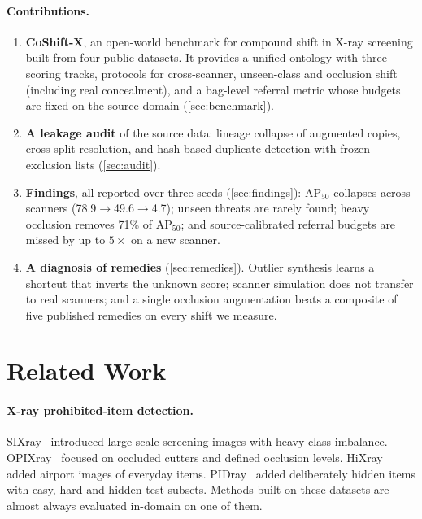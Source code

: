 \documentclass[10pt,twocolumn,letterpaper]{article}
\begin{document}
\paragraph{Contributions.}
\begin{enumerate}
\item \textbf{CoShift-X}, an open-world benchmark for compound shift in X-ray screening built from four public datasets. It provides a unified ontology with three scoring tracks, protocols for cross-scanner, unseen-class and occlusion shift (including real concealment), and a bag-level referral metric whose budgets are fixed on the source domain (\cref{sec:benchmark}).
\item \textbf{A leakage audit} of the source data: lineage collapse of augmented copies, cross-split resolution, and hash-based duplicate detection with frozen exclusion lists (\cref{sec:audit}).
\item \textbf{Findings}, all reported over three seeds (\cref{sec:findings}): AP$_{50}$ collapses across scanners (78.9$\rightarrow$49.6$\rightarrow$4.7); unseen threats are rarely found; heavy occlusion removes 71\% of AP$_{50}$; and source-calibrated referral budgets are missed by up to $5\times$ on a new scanner.
\item \textbf{A diagnosis of remedies} (\cref{sec:remedies}). Outlier synthesis learns a shortcut that inverts the unknown score; scanner simulation does not transfer to real scanners; and a single occlusion augmentation beats a composite of five published remedies on every shift we measure.
\end{enumerate}

\section{Related Work}
\label{sec:related}
\paragraph{X-ray prohibited-item detection.}
SIXray~\cite{miao2019sixray} introduced large-scale screening images with heavy class imbalance. OPIXray~\cite{wei2020opixray} focused on occluded cutters and defined occlusion levels. HiXray~\cite{tao2021hixray} added airport images of everyday items. PIDray~\cite{wang2021pidray} added deliberately hidden items with easy, hard and hidden test subsets. Methods built on these datasets are almost always evaluated in-domain on one of them.
\end{document}
